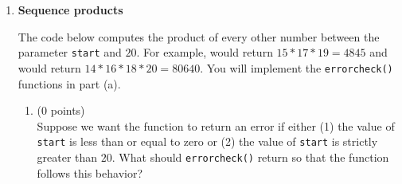 \documentclass{article}
\newcounter{points}
\newcounter{bonuspoints}
\newcommand\setzeropoints{\addtocounter{points}{0}(0 points)}
\newcommand\setzerobonuspoints{\addtocounter{bonuspoints}{0}(0 bonus points)}
\begin{document}
\begin{enumerate}
\begin{enumerate}
\item \setzeropoints \\

\end{enumerate}

\begin{enumerate}
\setcounter{enumii}{1}
\item \setzeropoints \\

\end{enumerate}

\begin{enumerate}
\setcounter{enumii}{2}
\item \setzeropoints \\

\end{enumerate}

\begin{enumerate}
\setcounter{enumii}{3}
\item \setzeropoints \\

\end{enumerate}

\begin{enumerate}
\setcounter{enumii}{4}
\item \setzerobonuspoints \\

\end{enumerate}


\item \textbf{Sequence products}

The code below computes the product of every other number between the parameter \texttt{start} and $20$.  For example,  would return $15 * 17 * 19 = 4845$ and  would return $14 * 16 * 18 * 20 = 80640$.  You will implement the \texttt{errorcheck()} functions in part (a). \\



\begin{enumerate}
\item \setzeropoints \\
Suppose we want the function to return an error if either (1) the value of \texttt{start} is less than or equal to zero or (2) the value of \texttt{start} is strictly greater than $20$.  What should \texttt{errorcheck()} return so that the function follows this behavior?
\end{enumerate}


\end{enumerate}
\end{document}

